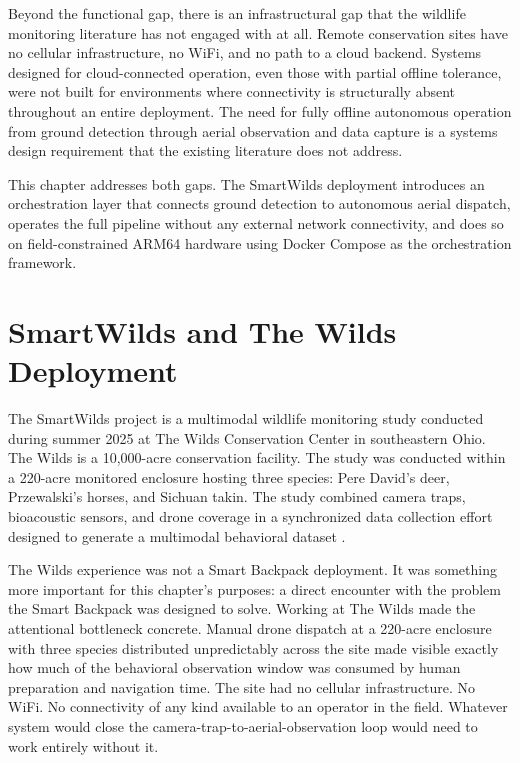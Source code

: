 Beyond the functional gap, there is an infrastructural gap that the wildlife monitoring literature has not engaged with at all. Remote conservation sites have no cellular infrastructure, no WiFi, and no path to a cloud backend. Systems designed for cloud-connected operation, even those with partial offline tolerance, were not built for environments where connectivity is structurally absent throughout an entire deployment. The need for fully offline autonomous operation from ground detection through aerial observation and data capture is a systems design requirement that the existing literature does not address.

This chapter addresses both gaps. The SmartWilds deployment introduces an orchestration layer that connects ground detection to autonomous aerial dispatch, operates the full pipeline without any external network connectivity, and does so on field-constrained ARM64 hardware using Docker Compose as the orchestration framework.

\section{SmartWilds and The Wilds Deployment}
\label{sec:ch4_arch_decision}
The SmartWilds project is a multimodal wildlife monitoring study conducted during summer 2025 at The Wilds Conservation Center in southeastern Ohio. The Wilds is a 10,000-acre conservation facility. The study was conducted within a 220-acre monitored enclosure hosting three species: Pere David's deer, Przewalski's horses, and Sichuan takin. The study combined camera traps, bioacoustic sensors, and drone coverage in a synchronized data collection effort designed to generate a multimodal behavioral dataset \cite{kline2025smartwilds}.

The Wilds experience was not a Smart Backpack deployment. It was something more important for this chapter's purposes: a direct encounter with the problem the Smart Backpack was designed to solve. Working at The Wilds made the attentional bottleneck concrete. Manual drone dispatch at a 220-acre enclosure with three species distributed unpredictably across the site made visible exactly how much of the behavioral observation window was consumed by human preparation and navigation time. The site had no cellular infrastructure. No WiFi. No connectivity of any kind available to an operator in the field. Whatever system would close the camera-trap-to-aerial-observation loop would need to work entirely without it.

